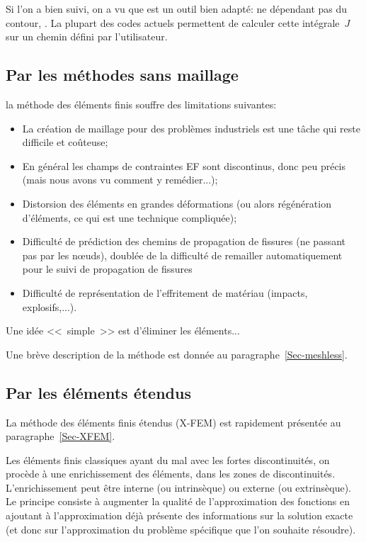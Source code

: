 \medskip
Si l'on a bien suivi, on a vu que  est un outil bien adapté: ne
dépendant pas du contour, .
La plupart des codes actuels permettent de calculer cette intégrale~$J$ sur un chemin
défini par l'utilisateur.



\medskip
\subsection{Par les méthodes sans maillage}

la méthode des éléments finis souffre des limitations suivantes:
\begin{itemize}
  \item La création de maillage pour des problèmes industriels est une tâche qui reste
	difficile et coûteuse;
  \item En général les champs de contraintes EF sont discontinus, donc peu précis (mais
	nous avons vu comment y remédier...);
  \item Distorsion des éléments en grandes déformations (ou alors régénération
	d'éléments, ce qui est une technique compliquée);
  \item Difficulté de prédiction des chemins de propagation de fissures (ne passant pas par
	les nœuds), doublée de la difficulté de remailler automatiquement pour le suivi de
	propagation de fissures
  \item Difficulté de représentation de l'effritement de matériau (impacts, explosifs,...).
\end{itemize}
Une idée <<~simple~>> est d'éliminer les éléments...

\medskip
Une brève description de la méthode est donnée au paragraphe~\ref{Sec-meshless}.


\medskip
\subsection{Par les éléments étendus}

La méthode des éléments finis étendus (X-FEM) est rapidement présentée au
paragraphe~\ref{Sec-XFEM}.

\medskip
Les éléments finis classiques ayant du mal avec les fortes discontinuités, on procède
à une enrichissement des éléments, dans les zones de discontinuités.
L'enrichissement peut être interne (ou intrinsèque) ou externe (ou extrinsèque).
Le principe consiste à augmenter la qualité de l'approximation des fonctions en ajoutant
à l'approximation déjà présente des informations sur la solution exacte (et donc sur
l'approximation du problème spécifique que l'on souhaite résoudre).



